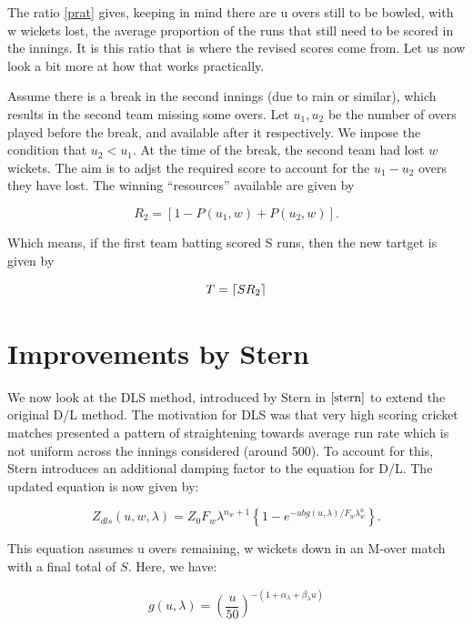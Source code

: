The ratio \ref{prat} gives, keeping in mind there are u overs still to be bowled, with w wickets
lost, the average proportion of the runs that still need to be scored in the innings. 
It is this ratio that is where the revised scores come from. Let us now look a bit more at how that works
practically.

\begin{example}
    \label{dlExMain}
    Assume there is a break in the second innings (due to rain or similar), which results in the second team missing some overs.
    Let $u_1, u_2$ be the number of overs played before the break, and available after it respectively. We impose the condition
    that $u_2 < u_1$. At the time of the break, the second team had lost $w$ wickets. The aim is to adjst the required score to account
    for the $u_1 - u_2$ overs they have lost. The winning ``resources'' available are given by

    \[
        R_2 = [1-P(u_1,w)+P(u_2,w)].
    \]  

    Which means, if the first team batting scored S runs, then the new tartget is given by

    \[
        T = \lceil SR_2\rceil
    \]  
\end{example}

\section{Improvements by Stern}
We now look at the DLS method, introduced by Stern in $\cite{stern}$ to extend the original D/L method. The motivation for DLS was that very high scoring
cricket matches presented a pattern of straightening towards average run rate which is not uniform across the innings considered (around 500). To account for 
this, Stern introduces an additional damping factor to the equation for D/L. The updated equation is now given by:

\begin{equation}
    \label{dls}
    Z_{dls}(u,w,\lambda) = Z_0F_w\lambda^{n_w+1} \left\{ 1-e^{-ubg(u,\lambda)/F_w\lambda^n_w} \right\}.
\end{equation}

This equation assumes u overs remaining, w wickets down in an M-over match with a final total of $S$. Here, we have:

\begin{equation}
    \label{gfunc}
    g(u,\lambda) = \left (\frac{u}{50} \right)^{-(1+\alpha_\lambda+\beta_\lambda u)}
\end{equation}

